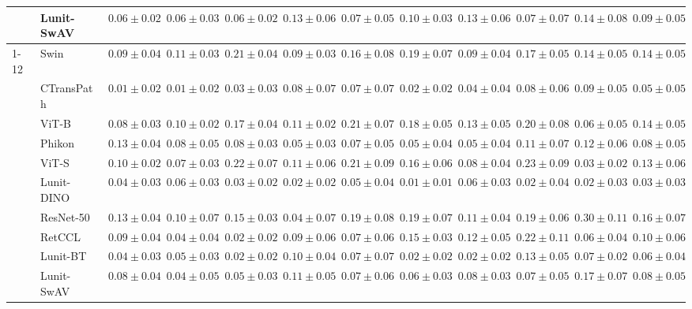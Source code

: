 \begin{tabular}{ll|cccc|c|cccc|c}
 & Lunit-SwAV & $0.06 \pm 0.02$ & $0.06 \pm 0.03$ & $0.06 \pm 0.02$ & $0.13 \pm 0.06$ & $0.07 \pm 0.05$ & $0.10 \pm 0.03$ & $0.13 \pm 0.06$ & $0.07 \pm 0.07$ & $0.14 \pm 0.08$ & $0.09 \pm 0.05$ \\
\cline{1-12}
\multirow[t]{10}{*}{Transformer} & Swin & $0.09 \pm 0.04$ & $0.11 \pm 0.03$ & $0.21 \pm 0.04$ & $0.09 \pm 0.03$ & $0.16 \pm 0.08$ & $0.19 \pm 0.07$ & $0.09 \pm 0.04$ & $0.17 \pm 0.05$ & $0.14 \pm 0.05$ & $0.14 \pm 0.05$ \\
 & CTransPath & $\mathbf{0.01 \pm 0.02}$ & $\mathbf{0.01 \pm 0.02}$ & $0.03 \pm 0.03$ & $0.08 \pm 0.07$ & $0.07 \pm 0.07$ & $0.02 \pm 0.02$ & $0.04 \pm 0.04$ & $0.08 \pm 0.06$ & $0.09 \pm 0.05$ & $0.05 \pm 0.05$ \\
 & ViT-B & $0.08 \pm 0.03$ & $0.10 \pm 0.02$ & $0.17 \pm 0.04$ & $0.11 \pm 0.02$ & $0.21 \pm 0.07$ & $0.18 \pm 0.05$ & $0.13 \pm 0.05$ & $0.20 \pm 0.08$ & $0.06 \pm 0.05$ & $0.14 \pm 0.05$ \\
 & Phikon & $0.13 \pm 0.04$ & $0.08 \pm 0.05$ & $0.08 \pm 0.03$ & $0.05 \pm 0.03$ & $0.07 \pm 0.05$ & $0.05 \pm 0.04$ & $0.05 \pm 0.04$ & $0.11 \pm 0.07$ & $0.12 \pm 0.06$ & $0.08 \pm 0.05$ \\
 & ViT-S & $0.10 \pm 0.02$ & $0.07 \pm 0.03$ & $0.22 \pm 0.07$ & $0.11 \pm 0.06$ & $0.21 \pm 0.09$ & $0.16 \pm 0.06$ & $0.08 \pm 0.04$ & $0.23 \pm 0.09$ & $0.03 \pm 0.02$ & $0.13 \pm 0.06$ \\
 & Lunit-DINO & $0.04 \pm 0.03$ & $0.06 \pm 0.03$ & $0.03 \pm 0.02$ & $\mathbf{0.02 \pm 0.02}$ & $\mathbf{0.05 \pm 0.04}$ & $\mathbf{0.01 \pm 0.01}$ & $0.06 \pm 0.03$ & $\mathbf{0.02 \pm 0.04}$ & $\mathbf{0.02 \pm 0.03}$ & $\mathbf{0.03 \pm 0.03}$ \\
 & ResNet-50 & $0.13 \pm 0.04$ & $0.10 \pm 0.07$ & $0.15 \pm 0.03$ & $0.04 \pm 0.07$ & $0.19 \pm 0.08$ & $0.19 \pm 0.07$ & $0.11 \pm 0.04$ & $0.19 \pm 0.06$ & $0.30 \pm 0.11$ & $0.16 \pm 0.07$ \\
 & RetCCL & $0.09 \pm 0.04$ & $0.04 \pm 0.04$ & $0.02 \pm 0.02$ & $0.09 \pm 0.06$ & $0.07 \pm 0.06$ & $0.15 \pm 0.03$ & $0.12 \pm 0.05$ & $0.22 \pm 0.11$ & $0.06 \pm 0.04$ & $0.10 \pm 0.06$ \\
 & Lunit-BT & $0.04 \pm 0.03$ & $0.05 \pm 0.03$ & $\mathbf{0.02 \pm 0.02}$ & $0.10 \pm 0.04$ & $0.07 \pm 0.07$ & $0.02 \pm 0.02$ & $\mathbf{0.02 \pm 0.02}$ & $0.13 \pm 0.05$ & $0.07 \pm 0.02$ & $0.06 \pm 0.04$ \\
 & Lunit-SwAV & $0.08 \pm 0.04$ & $0.04 \pm 0.05$ & $0.05 \pm 0.03$ & $0.11 \pm 0.05$ & $0.07 \pm 0.06$ & $0.06 \pm 0.03$ & $0.08 \pm 0.03$ & $0.07 \pm 0.05$ & $0.17 \pm 0.07$ & $0.08 \pm 0.05$ \\

\end{tabular}
